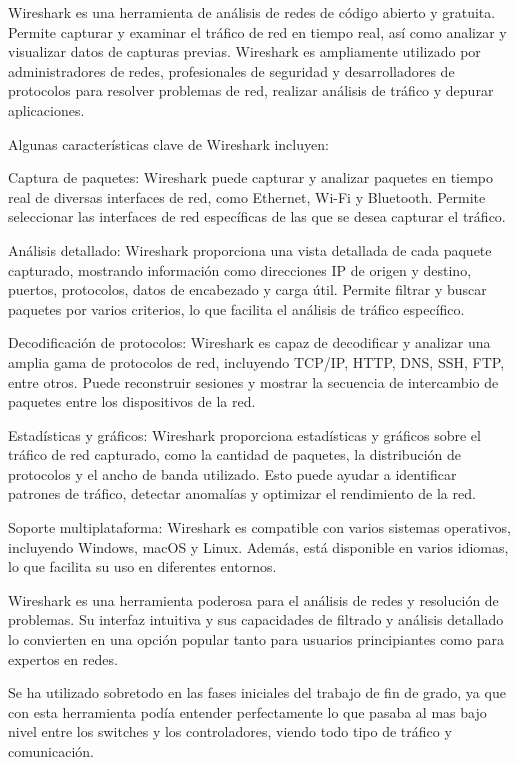 \documentclass[a4paper, 12pt]{book}
\begin{document}
	Wireshark es una herramienta de análisis de redes de código abierto y gratuita. Permite capturar y examinar el tráfico de red en tiempo real, así como analizar y visualizar datos de capturas previas. Wireshark es ampliamente utilizado por administradores de redes, profesionales de seguridad y desarrolladores de protocolos para resolver problemas de red, realizar análisis de tráfico y depurar aplicaciones.
	
	Algunas características clave de Wireshark incluyen:
	
	Captura de paquetes: Wireshark puede capturar y analizar paquetes en tiempo real de diversas interfaces de red, como Ethernet, Wi-Fi y Bluetooth. Permite seleccionar las interfaces de red específicas de las que se desea capturar el tráfico.
	
	Análisis detallado: Wireshark proporciona una vista detallada de cada paquete capturado, mostrando información como direcciones IP de origen y destino, puertos, protocolos, datos de encabezado y carga útil. Permite filtrar y buscar paquetes por varios criterios, lo que facilita el análisis de tráfico específico.
	
	Decodificación de protocolos: Wireshark es capaz de decodificar y analizar una amplia gama de protocolos de red, incluyendo TCP/IP, HTTP, DNS, SSH, FTP, entre otros. Puede reconstruir sesiones y mostrar la secuencia de intercambio de paquetes entre los dispositivos de la red.
	
	Estadísticas y gráficos: Wireshark proporciona estadísticas y gráficos sobre el tráfico de red capturado, como la cantidad de paquetes, la distribución de protocolos y el ancho de banda utilizado. Esto puede ayudar a identificar patrones de tráfico, detectar anomalías y optimizar el rendimiento de la red.
	
	Soporte multiplataforma: Wireshark es compatible con varios sistemas operativos, incluyendo Windows, macOS y Linux. Además, está disponible en varios idiomas, lo que facilita su uso en diferentes entornos.
	
	Wireshark es una herramienta poderosa para el análisis de redes y resolución de problemas. Su interfaz intuitiva y sus capacidades de filtrado y análisis detallado lo convierten en una opción popular tanto para usuarios principiantes como para expertos en redes.
	
	Se ha utilizado sobretodo en las fases iniciales del trabajo de fin de grado, ya que con esta herramienta podía entender perfectamente lo que pasaba al mas bajo nivel entre los switches y los controladores, viendo todo tipo de tráfico y comunicación.	
	
\end{document}
